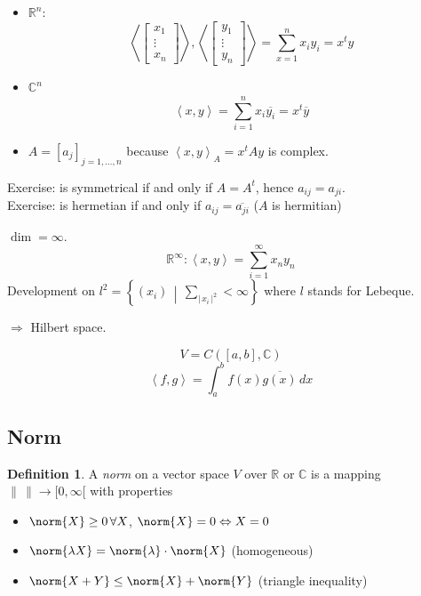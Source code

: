 \documentclass[a4paper,landscape,twocolumn]{article}
\newcommand\abs[1]{|\,#1\,|}
\newcommand\setdef[2]{\left\{#1\,\middle|\,#2\right\}}
\newcommand\functional[1]{\left\langle{#1}\right\rangle}
\theoremstyle{definition}
\newtheorem{defi}{Definition}
\DeclarePairedDelimiter\norm\lVert\rVert
\begin{document}
\begin{itemize}
  \item $\mathbb R^n$:
    \[
      \left\langle\begin{bmatrix} x_1 \\ \vdots \\ x_n \end{bmatrix}\right\rangle,
       \left\langle\begin{bmatrix} y_1 \\ \vdots \\ y_n \end{bmatrix}\right\rangle
       = \sum_{x=1}^n x_i y_i = x^t y
    \]
  \item $\mathbb C^n$
    \[ \functional{x,y} = \sum_{i=1}^n x_i \overline{y_i} = x^t \overline{y} \]
  \item
    $A = [a_j]_{j=1,\ldots,n}$ because $\functional{x,y}_A = x^t A y$ is complex.
\end{itemize}

Exercise: is symmetrical if and only if $A = A^t$, hence $a_{ij} = a_{ji}$. \\
Exercise: is hermetian if and only if $a_{ij} = \overline{a_{ji}}$ ($A$ is hermitian)


$\dim = \infty$.
\[ \mathbb R^\infty: \functional{x,y} = \sum_{i=1}^\infty x_n y_n \]
Development on $l^2 = \setdef{(x_i)}{\sum_{\abs{x_i}^2} < \infty}$
where $l$ stands for Lebeque.

$\Rightarrow$ Hilbert space.

\[ V = C([a,b], \mathbb C) \]
\[ \functional{f,g} = \int_a^b f(x) \overline{g(x)} \, dx \]

\subsection{Norm}
%
\begin{defi}
  \label{def-8.16}
  A \emph{norm} on a vector space $V$ over $\mathbb R$ or $\mathbb C$ is a mapping
  $\| \, \| \to [0,\infty[$ with properties
  \begin{itemize}
    \item[N1.] $\norm{X} \geq 0 \, \forall X$, $\norm{X} = 0 \Leftrightarrow X = 0$
    \item[N2.] $\norm{\lambda X} = \norm{\lambda} \cdot \norm{X}$ (homogeneous)
    \item[N3.] $\norm{X + Y} \leq \norm{X} + \norm{Y}$ (triangle inequality)
  \end{itemize}
\end{defi}
\end{document}
